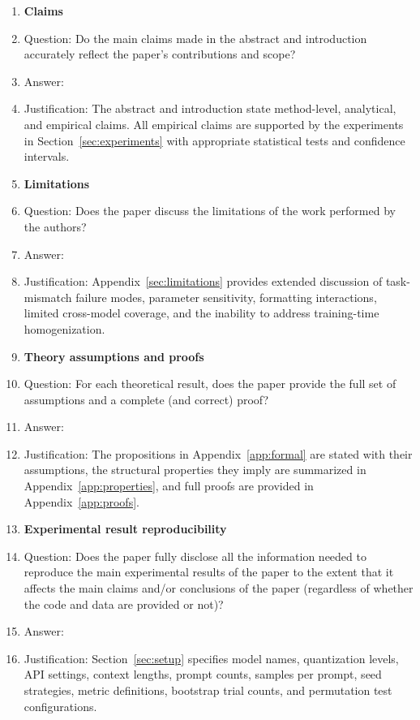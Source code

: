 \documentclass{article}
\begin{document}
\begin{enumerate}

\item {\bf Claims}
    \item[] Question: Do the main claims made in the abstract and introduction accurately reflect the paper's contributions and scope?
    \item[] Answer: \answerYes{}
    \item[] Justification: The abstract and introduction state method-level, analytical, and empirical claims. All empirical claims are supported by the experiments in Section~\ref{sec:experiments} with appropriate statistical tests and confidence intervals.

\item {\bf Limitations}
    \item[] Question: Does the paper discuss the limitations of the work performed by the authors?
    \item[] Answer: \answerYes{}
    \item[] Justification: Appendix~\ref{sec:limitations} provides extended discussion of task-mismatch failure modes, parameter sensitivity, formatting interactions, limited cross-model coverage, and the inability to address training-time homogenization.

\item {\bf Theory assumptions and proofs}
    \item[] Question: For each theoretical result, does the paper provide the full set of assumptions and a complete (and correct) proof?
    \item[] Answer: \answerYes{}
    \item[] Justification: The propositions in Appendix~\ref{app:formal} are stated with their assumptions, the structural properties they imply are summarized in Appendix~\ref{app:properties}, and full proofs are provided in Appendix~\ref{app:proofs}.

\item {\bf Experimental result reproducibility}
    \item[] Question: Does the paper fully disclose all the information needed to reproduce the main experimental results of the paper to the extent that it affects the main claims and/or conclusions of the paper (regardless of whether the code and data are provided or not)?
    \item[] Answer: \answerYes{}
    \item[] Justification: Section~\ref{sec:setup} specifies model names, quantization levels, API settings, context lengths, prompt counts, samples per prompt, seed strategies, metric definitions, bootstrap trial counts, and permutation test configurations.


\end{enumerate}
\end{document}
